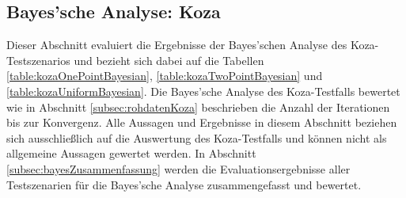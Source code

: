 \subsection{Bayes'sche Analyse: Koza}
\label{subsec:bayesKoza}

Dieser Abschnitt evaluiert die Ergebnisse der Bayes'schen Analyse des Koza-Testszenarios und bezieht sich dabei auf die Tabellen \ref{table:kozaOnePointBayesian}, \ref{table:kozaTwoPointBayesian} und \ref{table:kozaUniformBayesian}.
Die Bayes'sche Analyse des Koza-Testfalls bewertet wie in Abschnitt \ref{subsec:rohdatenKoza} beschrieben die Anzahl der Iterationen bis zur Konvergenz.
Alle Aussagen und Ergebnisse in diesem Abschnitt beziehen sich ausschließlich auf die Auswertung des Koza-Testfalls und können nicht als allgemeine Aussagen gewertet werden.
In Abschnitt \ref{subsec:bayesZusammenfassung} werden die Evaluationsergebnisse aller Testszenarien für die Bayes'sche Analyse zusammengefasst und bewertet.
